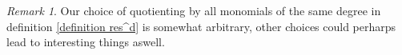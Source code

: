 \documentclass{article}
\newcommand{\Z}{\mathbb{Z}}
\newcommand{\Q}{\mathbb{Q}}
\DeclareMathOperator{\spec}{Spec}
\newtheorem{prop}[thm]{Proposition}
\theoremstyle{definition}
\theoremstyle{remark}
\newtheorem{rem}{Remark}[thm]
\begin{document}




\begin{rem}
Our choice of quotienting by all monomials of the same degree in definition \ref{definition res^d} is somewhat arbitrary, other choices could perharps lead to interesting things aswell.
\end{rem}


 

\end{document}
